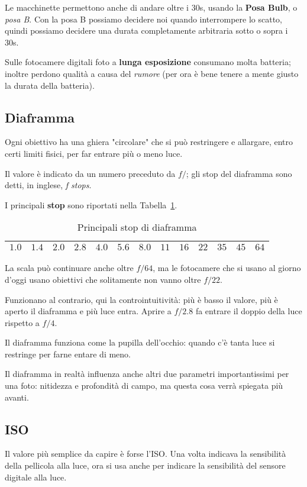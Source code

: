 Le macchinette permettono anche di andare oltre i 30s, usando la \textbf{Posa Bulb}, o \textit{posa B}.
Con la posa B possiamo decidere noi quando interrompere lo scatto, quindi possiamo decidere una durata completamente arbitraria sotto o sopra i 30s.

\nb Sulle fotocamere digitali foto a \textbf{lunga esposizione} consumano molta batteria; inoltre perdono qualità a causa del \textit{rumore} (per ora è bene tenere a mente giusto la durata della batteria).


\subsection{Diaframma} \label{subsec:diaframma}
Ogni obiettivo ha una ghiera "circolare" che si può restringere e allargare, entro certi
limiti fisici, per far entrare più o meno luce.

Il valore è indicato da un numero preceduto da $f/$; gli stop del diaframma sono detti, in inglese, \textit{f stops}.

I principali \textbf{stop} sono riportati nella Tabella~\ref{table:stop_f}.
\begin{table}[h]
    \centering
    \begin{tabular}{|l|l|l|l|l|l|l|l|l|l|l|l|l|}
        \hline
        $1.0$ & $1.4$ & $2.0$ & $2.8$ & $4.0$ & $5.6$ & $8.0$ & $11$ & $16$ & $22$ & $35$ & $45$ & $64$\\
        \hline
    \end{tabular}
    \caption{Principali stop di diaframma}
    \label{table:stop_f}
\end{table}

\nb La scala può continuare anche oltre $f/64$, ma le fotocamere che si usano al giorno d'oggi usano obiettivi che solitamente non vanno oltre $f/22$.

Funzionano al contrario, qui la controintuitività: più è basso il valore, più è aperto il
diaframma e più luce entra.\newline
Aprire a $f/2.8$ fa entrare il doppio della luce rispetto a $f/4$.

Il diaframma funziona come la pupilla dell'occhio: quando c'è tanta luce si restringe per farne entare di meno.

Il diaframma in realtà influenza anche altri due parametri importantissimi per una foto:
nitidezza e profondità di campo, ma questa cosa verrà spiegata più avanti.


\subsection{ISO}  \label{subsec:ISO}
Il valore più semplice da capire è forse l'ISO.
Una volta indicava la sensibilità della pellicola alla luce, ora si usa anche per indicare la sensibilità del sensore digitale alla luce.

